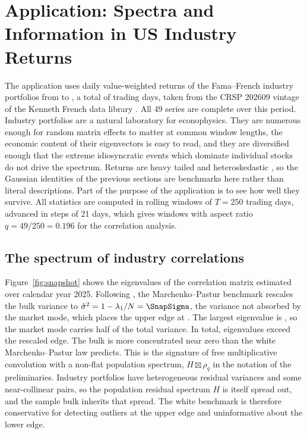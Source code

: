 \section*{Application: Spectra and Information in US Industry Returns}

The application uses daily value-weighted returns of the \NAssets{} Fama--French industry portfolios from \SampleStart{} to \SampleEnd{}, a total of \NDays{} trading days, taken from the CRSP 202609 vintage of the Kenneth French data library \citep{fama1997industry,french2026data}. All 49 series are complete over this period. Industry portfolios are a natural laboratory for econophysics. They are numerous enough for random matrix effects to matter at common window lengths, the economic content of their eigenvectors is easy to read, and they are diversified enough that the extreme idiosyncratic events which dominate individual stocks do not drive the spectrum. Returns are heavy tailed and heteroskedastic \citep{cont2001empirical}, so the Gaussian identities of the previous sections are benchmarks here rather than literal descriptions. Part of the purpose of the application is to see how well they survive. All statistics are computed in rolling windows of $T=250$ trading days, advanced in steps of 21 days, which gives \NWindows{} windows with aspect ratio $q=49/250=0.196$ for the correlation analysis.

\subsection*{The spectrum of industry correlations}

Figure~\ref{fig:snapshot} shows the eigenvalues of the correlation matrix estimated over calendar year 2025. Following \citet{laloux1999noise}, the Marchenko--Pastur benchmark rescales the bulk variance to $\hat\sigma^2=1-\lambda_1/N=\SnapSigma$, the variance not absorbed by the market mode, which places the upper edge at \SnapEdge. The largest eigenvalue is \SnapLambdaOne{}, so the market mode carries half of the total variance. In total, \SnapNOut{} eigenvalues exceed the rescaled edge. The bulk is more concentrated near zero than the white Marchenko--Pastur law predicts. This is the signature of free multiplicative convolution with a non-flat population spectrum, $H\boxtimes\rho_q$ in the notation of the preliminaries. Industry portfolios have heterogeneous residual variances and some near-collinear pairs, so the population residual spectrum $H$ is itself spread out, and the sample bulk inherits that spread. The white benchmark is therefore conservative for detecting outliers at the upper edge and uninformative about the lower edge.

